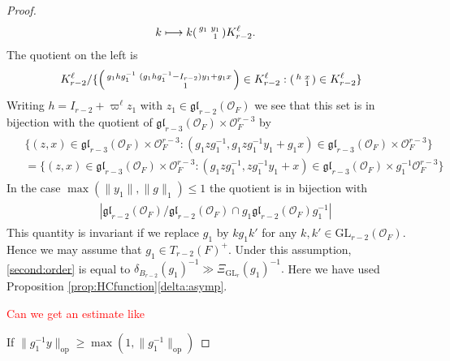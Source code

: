 \documentclass[12pt]{amsart}
\theoremstyle{remark}
\numberwithin{equation}{section}
\newcommand{\GL}{\mathrm{GL}}
\newcommand{\OO}{\mathcal{O}}
\theoremstyle{definition}
\newenvironment{psmatrix}
  {\left(\begin{smallmatrix}}
  {\end{smallmatrix}\right)}
\numberwithin{equation}{subsection}
\newcommand{\norm}[1]{\lVert#1\rVert}
\begin{document}
{\begin{proof}
\begin{align}
\begin{split}
k &\longmapsto k\begin{psmatrix} g_1 & y_1 \\ & 1 \end{psmatrix}K_{r-2}^\ell. \end{split}
\end{align}
The quotient on the left is
\begin{align}
K_{r-2}^{\ell}/\{ \begin{psmatrix} g_1h g_1^{-1} & (g_1hg_1^{-1}-I_{r-2})y_1+g_1x \\ & 1 \end{psmatrix} \in K_{r-2}^\ell: \begin{psmatrix} h & x \\ & 1 \end{psmatrix} \in K_{r-2}^\ell\}
\end{align}
Writing $h=I_{r-2}+\varpi^\ell z_1$ with $z_1 \in \mathfrak{gl}_{r-2}(\OO_F)$ we see that this set is in bijection with the quotient of $ \mathfrak{gl}_{r-3}(\OO_F) \times \OO_F^{r-3}$ by
\begin{align} \begin{split} \label{quot}
&\{(z,x) \in \mathfrak{gl}_{r-3}(\OO_F) \times \OO_F^{r-3}: (g_1zg_1^{-1},g_1zg_1^{-1}y_1 +g_1 x )\in \mathfrak{gl}_{r-3}(\OO_F) \times \OO_F^{r-3}\}\\
&=\{(z,x) \in \mathfrak{gl}_{r-3}(\OO_F) \times \OO_F^{r-3}: (g_1zg_1^{-1},zg_1^{-1}y_1 + x )\in \mathfrak{gl}_{r-3}(\OO_F) \times g_1^{-1}\OO_F^{r-3}\} \end{split}
\end{align}
In the case
$\max(\norm{y_1},\norm{g}_1) \leq 1$ the quotient is in bijection with 
\begin{align} \label{second:order} \begin{split}
&|\mathfrak{gl}_{r-2}(\OO_F)/\mathfrak{gl}_{r-2}(\OO_F) \cap g_1\mathfrak{gl}_{r-2}(\OO_F)g_1^{-1}| \end{split}
\end{align}
This quantity is invariant if we replace $g_1$ by $kg_1k'$ for any $k,k' \in \GL_{r-2}(\OO_F).$  Hence we may assume that $g_1 \in T_{r-2}(F)^+.$  Under this assumption, \eqref{second:order} is equal to $\delta_{B_{r-2}}(g_1)^{-1} \gg \Xi_{\GL_r}(g_1)^{-1}.$  Here we have used Proposition \ref{prop:HCfunction}\ref{delta:asymp}.

\textcolor{red}{Can we get an estimate like }





If $\norm{g_1^{-1}y}_{\mathrm{op}} \geq \max(1,\norm{g_1^{-1}}_{\mathrm{op}})$



\end{proof}}
\end{document}

